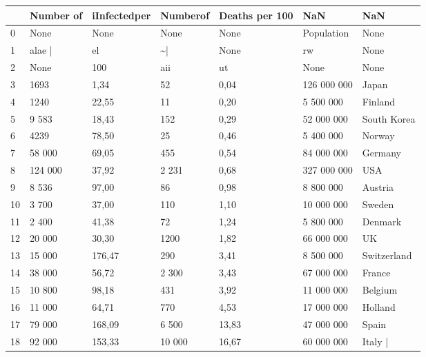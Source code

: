 \begin{tabular}{lllllll}
\toprule
{} & Number of & iInfectedper & Numberof & Deaths per 100 &          NaN &          NaN \\
\midrule
0  &      None &         None &     None &           None &   Population &         None \\
1  &    alae | &           el &      \textasciitilde  | &           None &           rw &         None \\
2  &      None &          100 &      aii &             ut &         None &         None \\
3  &      1693 &         1,34 &       52 &           0,04 &  126 000 000 &        Japan \\
4  &      1240 &        22,55 &       11 &           0,20 &    5 500 000 &      Finland \\
5  &     9 583 &        18,43 &      152 &           0,29 &   52 000 000 &  South Korea \\
6  &      4239 &        78,50 &       25 &           0,46 &    5 400 000 &       Norway \\
7  &    58 000 &        69,05 &      455 &           0,54 &   84 000 000 &      Germany \\
8  &   124 000 &        37,92 &    2 231 &           0,68 &  327 000 000 &          USA \\
9  &     8 536 &        97,00 &       86 &           0,98 &    8 800 000 &      Austria \\
10 &     3 700 &        37,00 &      110 &           1,10 &   10 000 000 &       Sweden \\
11 &     2 400 &        41,38 &       72 &           1,24 &    5 800 000 &      Denmark \\
12 &    20 000 &        30,30 &     1200 &           1,82 &   66 000 000 &           UK \\
13 &    15 000 &       176,47 &      290 &           3,41 &    8 500 000 &  Switzerland \\
14 &    38 000 &        56,72 &    2 300 &           3,43 &   67 000 000 &       France \\
15 &    10 800 &        98,18 &      431 &           3,92 &   11 000 000 &      Belgium \\
16 &    11 000 &        64,71 &      770 &           4,53 &   17 000 000 &      Holland \\
17 &    79 000 &       168,09 &    6 500 &          13,83 &   47 000 000 &        Spain \\
18 &    92 000 &       153,33 &   10 000 &          16,67 &   60 000 000 &      Italy | \\
\bottomrule
\end{tabular}

